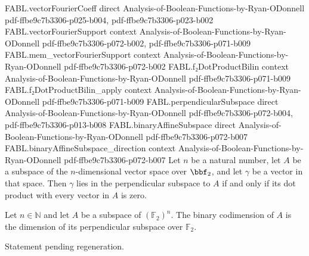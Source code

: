 \begin{theorem}
\proofstep
  {FABL.vectorFourierCoeff}
  {direct}
  {Analysis-of-Boolean-Functions-by-Ryan-ODonnell}
  {pdf-ffbe9c7b3306-p025-b004,
    pdf-ffbe9c7b3306-p023-b002}
\proofstep
  {FABL.vectorFourierSupport}
  {context}
  {Analysis-of-Boolean-Functions-by-Ryan-ODonnell}
  {pdf-ffbe9c7b3306-p072-b002,
    pdf-ffbe9c7b3306-p071-b009}
\proofstep
  {FABL.mem_vectorFourierSupport}
  {context}
  {Analysis-of-Boolean-Functions-by-Ryan-ODonnell}
  {pdf-ffbe9c7b3306-p072-b002}
\proofstep
  {FABL.f₂DotProductBilin}
  {context}
  {Analysis-of-Boolean-Functions-by-Ryan-ODonnell}
  {pdf-ffbe9c7b3306-p071-b009}
\proofstep
  {FABL.f₂DotProductBilin_apply}
  {context}
  {Analysis-of-Boolean-Functions-by-Ryan-ODonnell}
  {pdf-ffbe9c7b3306-p071-b009}
\proofstep
  {FABL.perpendicularSubspace}
  {direct}
  {Analysis-of-Boolean-Functions-by-Ryan-ODonnell}
  {pdf-ffbe9c7b3306-p072-b004,
    pdf-ffbe9c7b3306-p013-b008}
\proofstep
  {FABL.binaryAffineSubspace}
  {direct}
  {Analysis-of-Boolean-Functions-by-Ryan-ODonnell}
  {pdf-ffbe9c7b3306-p072-b007}
\proofstep
  {FABL.binaryAffineSubspace_direction}
  {context}
  {Analysis-of-Boolean-Functions-by-Ryan-ODonnell}
  {pdf-ffbe9c7b3306-p072-b007}
Let $n$ be a natural number, let $A$ be a subspace of the $n$-dimensional vector space
over $\bbf_2$, and let $\gamma$ be a vector in that space. Then $\gamma$ lies in the
perpendicular subspace to $A$ if and only if its dot product with every vector in $A$ is
zero.
\end{theorem}

\begin{definition}
\leanok
{}
Let $n\in\mathbb{N}$ and let $A$ be a subspace of $(\mathbb{F}_2)^n$. The binary
codimension of $A$ is the dimension of its perpendicular subspace over $\mathbb{F}_2$.
\end{definition}

\begin{theorem}
\label{FABL.finrank_perpendicularSubspace}
\leanok
{}
Statement pending regeneration.
\end{theorem}

